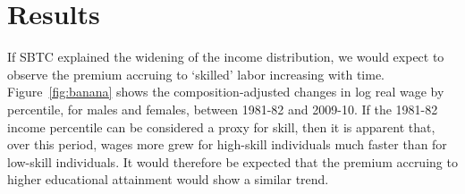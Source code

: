 \section{Results}

If SBTC explained the widening of the income distribution, we would expect to observe the premium accruing to `skilled' labor increasing with time. Figure~\ref{fig:banana} shows the composition-adjusted changes in log real wage by percentile, for males and females, between 1981-82 and 2009-10. If the 1981-82 income percentile can be considered a proxy for skill, then it is apparent that, over this period, wages more grew for high-skill individuals much faster than for low-skill individuals. It would therefore be expected that the premium accruing to higher educational attainment would show a similar trend.

